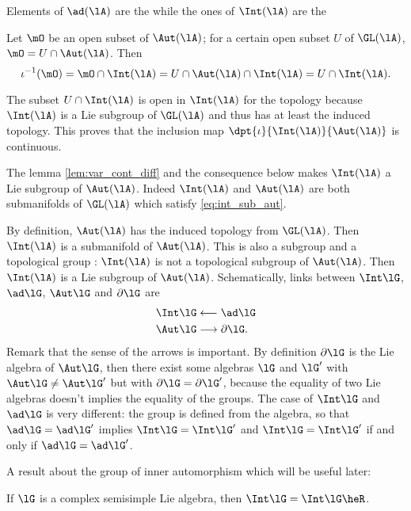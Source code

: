 Elements of $\ad(\lA)$ are the  while the ones of $\Int(\lA)$ are the 

Let $\mO$ be an open subset of $\Aut(\lA)$; for a certain open subset $U$ of $\GL(\lA)$, $\mO=U\cap\Aut(\lA)$. Then
\begin{equation}
	\iota^{-1}(\mO)=\mO\cap\Int(\lA)
	=U\cap\Aut(\lA)\cap\Int(\lA)
	=U\cap\Int(\lA).
\end{equation}

The subset $U\cap\Int(\lA)$ is open in $\Int(\lA)$ for the topology because $\Int(\lA)$ is a Lie subgroup of $\GL(\lA)$ and thus has at least the induced topology. This proves that the inclusion map $\dpt{\iota}{\Int(\lA)}{\Aut(\lA)}$ is continuous.

The lemma \ref{lem:var_cont_diff} and the consequence below makes $\Int(\lA)$ a Lie subgroup of $\Aut(\lA)$. Indeed $\Int(\lA)$ and $\Aut(\lA)$ are both submanifolds of $\GL(\lA)$ which satisfy \eqref{eq:int_sub_aut}.


By definition, $\Aut(\lA)$ has the induced topology from $\GL(\lA)$. Then $\Int(\lA)$ is a submanifold of $\Aut(\lA)$.
This is also a subgroup and a topological group : $\Int(\lA)$ is not a topological subgroup of $\Aut(\lA)$. Then $\Int(\lA)$ is a Lie subgroup of $\Aut(\lA)$. Schematically, links between $\Int\lG$, $\ad\lG$, $\Aut\lG$ and $\partial\lG$ are
\begin{subequations}\label{eq:schem_ad_int}
	\begin{align}
		\Int\lG & \longleftarrow\ad\lG        \\
		\Aut\lG & \longrightarrow\partial\lG.
	\end{align}
\end{subequations}
Remark that the sense of the arrows is important. By definition $\partial\lG$ is the Lie algebra of $\Aut\lG$, then there exist some algebras $\lG$ and $\lG'$ with $\Aut\lG\neq\Aut\lG'$ but with $\partial\lG=\partial\lG'$, because the equality of two Lie algebras doesn't implies the equality of the groups. The case of $\Int\lG$ and $\ad\lG$ is very different: the group is defined from the algebra, so that $\ad\lG=\ad\lG'$ implies $\Int\lG=\Int\lG'$ and $\Int\lG=\Int\lG'$ if and only if $\ad\lG=\ad\lG'$.

A result about the group of inner automorphism which will be useful later:

\begin{lemma}\label{lem:Int_g_gR}
	If $\lG$ is a complex semisimple Lie algebra, then $\Int\lG=\Int\lG\heR$.
\end{lemma}

